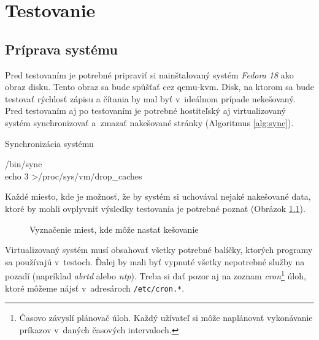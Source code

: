 %
%

\chapter{Testovanie}

\section{Príprava systému}

Pred testovaním je potrebné pripraviť si nainštalovaný systém \emph{Fedora 18}
ako obraz disku. Tento obraz sa bude spúšťať cez qemu-kvm. Disk, na ktorom sa
bude testovať rýchlosť zápisu a čítania by mal byť v~ideálnom prípade
nekešovaný.  Pred testovaním aj po testovaním je potrebné hostiteľský aj
virtualizovaný systém synchronizovať a~zmazať nakešované stránky (Algoritmus
\ref{alg:sync}).

\begin{algorithm}
    \label{alg:sync}
    \caption{Synchronizácia systému}
    /bin/sync\\
    echo 3 \textgreater /proc/sys/vm/drop\_caches
\end{algorithm}

Každé miesto, kde je možnosť, že by systém si uchovával nejaké nakešované data,
ktoré by mohli ovplyvniť výsledky testovania je potrebné poznať (Obrázok \ref{graf-cache}).

\begin{figure}[ht]
\begin{center}
  \caption{Vyznačenie miest, kde môže nastať kešovanie}
  \label{graf-cache}
\end{center}
\end{figure}

Virtualizovaný systém musí obsahovať všetky potrebné balíčky, ktorých programy
sa používajú v~testoch. Ďalej by mali byť vypnuté všetky nepotrebné služby na
pozadí (napríklad \emph{abrtd} alebo \emph{ntp}). Treba si dať pozor aj na
zoznam \emph{cron}\footnote{Časovo závyslí plánovač úloh. Každý užívateľ si
môže naplánovať vykonávanie príkazov v~daných časových intervaloch.} úloh,
ktoré môžeme nájsť v~adresároch \texttt{/etc/cron.*}.

